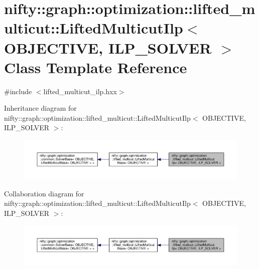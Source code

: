 \hypertarget{classnifty_1_1graph_1_1optimization_1_1lifted__multicut_1_1LiftedMulticutIlp}{}\section{nifty\+:\+:graph\+:\+:optimization\+:\+:lifted\+\_\+multicut\+:\+:Lifted\+Multicut\+Ilp$<$ O\+B\+J\+E\+C\+T\+I\+V\+E, I\+L\+P\+\_\+\+S\+O\+L\+V\+E\+R $>$ Class Template Reference}
\label{classnifty_1_1graph_1_1optimization_1_1lifted__multicut_1_1LiftedMulticutIlp}


{\ttfamily \#include $<$lifted\+\_\+multicut\+\_\+ilp.\+hxx$>$}



Inheritance diagram for nifty\+:\+:graph\+:\+:optimization\+:\+:lifted\+\_\+multicut\+:\+:Lifted\+Multicut\+Ilp$<$ O\+B\+J\+E\+C\+T\+I\+V\+E, I\+L\+P\+\_\+\+S\+O\+L\+V\+E\+R $>$\+:\nopagebreak
\begin{figure}[H]
\begin{center}
\leavevmode
\includegraphics[width=350pt]{classnifty_1_1graph_1_1optimization_1_1lifted__multicut_1_1LiftedMulticutIlp__inherit__graph}
\end{center}
\end{figure}


Collaboration diagram for nifty\+:\+:graph\+:\+:optimization\+:\+:lifted\+\_\+multicut\+:\+:Lifted\+Multicut\+Ilp$<$ O\+B\+J\+E\+C\+T\+I\+V\+E, I\+L\+P\+\_\+\+S\+O\+L\+V\+E\+R $>$\+:\nopagebreak
\begin{figure}[H]
\begin{center}
\leavevmode
\includegraphics[width=350pt]{classnifty_1_1graph_1_1optimization_1_1lifted__multicut_1_1LiftedMulticutIlp__coll__graph}
\end{center}
\end{figure}

